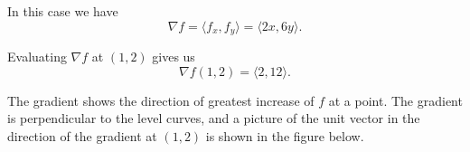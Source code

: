 \begin{activitySolution}
\ba 
   \item In this case we have
\[\nabla f = \langle f_x, f_y \rangle = \langle 2x, 6y \rangle.\]

    \item Evaluating $\nabla f$ at $(1,2)$ gives us
\[\nabla f(1,2) = \langle 2, 12 \rangle.\]

	\item The gradient shows the direction of greatest increase of $f$ at a point. The gradient is perpendicular to the level curves, and a picture of the unit vector in the direction of the gradient at $(1,2)$ is shown in the figure below. 
\begin{center}
\end{center}

\ea

\end{activitySolution}
\aftera
